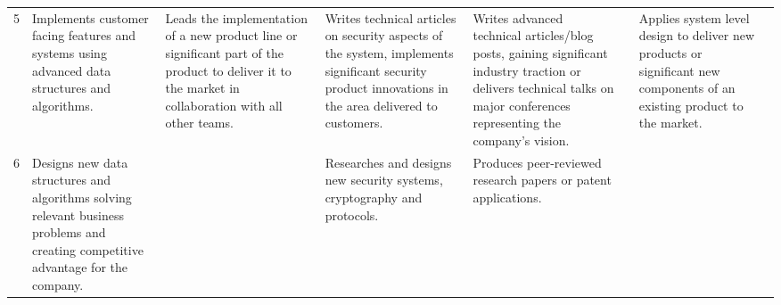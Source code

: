 \documentclass{article}
\begin{document}
\begin{center}
\begin{tabular}{ | m{15em} | m{15em} | m{15em} |  m{15em} | m{15em} |  m{15em} | m{15em} | m{15em} |}
    & \\
  \hline
    5&
    Implements customer facing features and systems using advanced data structures and algorithms.&
    Leads the implementation of a new product line or significant part of the product to deliver it to the market in collaboration with all other teams.&
    Writes technical articles on security aspects of the system, implements significant security product innovations in the area delivered to customers.&
    Writes advanced technical articles/blog posts, gaining significant industry traction or delivers technical talks on major conferences representing the company's vision.
    & &
    Applies system level design to deliver new products or significant new components of an existing product to the market.
    & \\
  \hline
    6&
    Designs new data structures and algorithms solving relevant business problems and creating competitive advantage for the company.&
    &
    Researches and designs new security systems, cryptography and protocols.&
    Produces peer-reviewed research papers or patent applications.
    & & & \\
\end{tabular}
\end{center}
\end{document}
